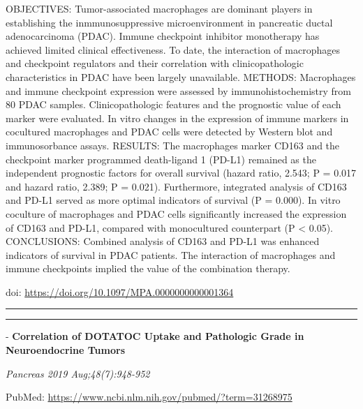 \documentclass[]{article}
\begin{document}
OBJECTIVES: Tumor-associated macrophages are dominant players in
establishing the inmmunosuppressive microenvironment in pancreatic
ductal adenocarcinoma (PDAC). Immune checkpoint inhibitor monotherapy
has achieved limited clinical effectiveness. To date, the interaction of
macrophages and checkpoint regulators and their correlation with
clinicopathologic characteristics in PDAC have been largely unavailable.
METHODS: Macrophages and immune checkpoint expression were assessed by
immunohistochemistry from 80 PDAC samples. Clinicopathologic features
and the prognostic value of each marker were evaluated. In vitro changes
in the expression of immune markers in cocultured macrophages and PDAC
cells were detected by Western blot and immunosorbance assays. RESULTS:
The macrophages marker CD163 and the checkpoint marker programmed
death-ligand 1 (PD-L1) remained as the independent prognostic factors
for overall survival (hazard ratio, 2.543; P = 0.017 and hazard ratio,
2.389; P = 0.021). Furthermore, integrated analysis of CD163 and PD-L1
served as more optimal indicators of survival (P = 0.000). In vitro
coculture of macrophages and PDAC cells significantly increased the
expression of CD163 and PD-L1, compared with monocultured counterpart (P
\textless{} 0.05). CONCLUSIONS: Combined analysis of CD163 and PD-L1 was
enhanced indicators of survival in PDAC patients. The interaction of
macrophages and immune checkpoints implied the value of the combination
therapy.

doi: \url{https://doi.org/10.1097/MPA.0000000000001364}

{}

{}

\begin{center}\rule{0.5\linewidth}{\linethickness}\end{center}

\begin{center}\rule{0.5\linewidth}{\linethickness}\end{center}

 - \textbf{Correlation of DOTATOC Uptake and Pathologic Grade in
Neuroendocrine Tumors}

\emph{Pancreas 2019 Aug;48(7):948-952}

PubMed: \url{https://www.ncbi.nlm.nih.gov/pubmed/?term=31268975}
\end{document}

